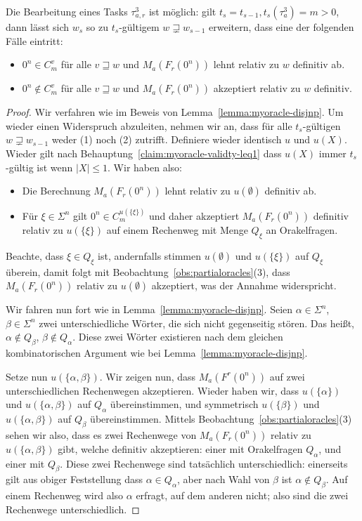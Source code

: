 \begin{lemma}\label{lemma:myoracle-up}
    Die Bearbeitung eines Tasks $\tau^3_{a,r}$ ist möglich: gilt $t_s=t_{s-1}, t_{s}(\tau^3_{a})=m>0$, dann lässt sich $w_{s}$ so zu $t_{s}$-gültigem $w\sqsupsetneq w_{s-1}$ erweitern, dass eine der folgenden Fälle eintritt:
        \begin{itemize}[nosep,endpenalty=10000]
            \item $0^n\in C_m^v$ für alle $v\sqsupseteq w$ und $M_a(F_r(0^n))$ lehnt relativ zu $w$ definitiv ab.
            \item $0^n\not\in C_m^v$ für alle $v\sqsupseteq w$ und $M_a(F_r(0^n))$ akzeptiert relativ zu $w$ definitiv.
        \end{itemize}
\end{lemma}
\begin{proof}
Wir verfahren wie im Beweis von Lemma~\ref{lemma:myoracle-disjnp}.
Um wieder einen Widerspruch abzuleiten, nehmen wir an, dass für alle $t_{s}$-gültigen $w\sqsupsetneq w_{s-1}$ weder (1) noch (2) zutrifft.
Definiere wieder identisch $u$ und $u(X)$.
Wieder gilt nach Behauptung~\ref{claim:myoracle-validty-leq1} dass $u(X)$ immer $t_{s}$-gültig ist wenn $|X|\leq 1$.
Wir haben also:
\begin{itemize}[nosep]
    \item Die Berechnung $M_a(F_r(0^n))$ lehnt relativ zu $u(\emptyset)$ definitiv ab.
    \item Für $\xi\in \Sigma^{n}$ gilt $0^n\in C_m^{u(\{\xi\})}$ und daher akzeptiert $M_a(F_r(0^n))$ definitiv relativ zu $u(\{\xi\})$ auf einem Rechenweg mit Menge $Q_\xi$ an Orakelfragen.
\end{itemize}

Beachte, dass $\xi\in Q_\xi$ ist, andernfalls stimmen $u(\emptyset)$ und $u(\{\xi\})$ auf $Q_\xi$ überein, damit folgt mit Beobachtung~\ref{obs:partialoracles}(3), dass $M_a(F_r(0^n))$ relativ zu $u(\emptyset)$ akzeptiert, was der Annahme widerspricht.

Wir fahren nun fort wie in Lemma~\ref{lemma:myoracle-disjnp}.
Seien $\alpha\in\Sigma^{n}$, $\beta\in\Sigma^{n}$ zwei unterschiedliche Wörter, die sich nicht gegenseitig stören. Das heißt, $\alpha\not\in Q_\beta$, $\beta\not\in Q_\alpha$.
Diese zwei Wörter existieren nach dem gleichen kombinatorischen Argument wie bei Lemma~\ref{lemma:myoracle-disjnp}.

Setze nun $u(\{\alpha, \beta\})$. Wir zeigen nun, dass $M_a(F^r(0^n))$ auf zwei unterschiedlichen Rechenwegen akzeptieren.
Wieder haben wir, dass $u(\{\alpha\})$ und $u(\{\alpha, \beta\})$ auf $Q_\alpha$ übereinstimmen, und symmetrisch $u(\{\beta\})$ und $u(\{\alpha, \beta\})$ auf $Q_\beta$ übereinstimmen.
Mittels Beobachtung~\ref{obs:partialoracles}(3) sehen wir also, dass es zwei Rechenwege von $M_a(F_r(0^n))$ relativ zu $u(\{\alpha, \beta\})$ gibt, welche definitiv akzeptieren: einer mit Orakelfragen $Q_\alpha$, und einer mit $Q_\beta$.
Diese zwei Rechenwege sind tatsächlich unterschiedlich:
einerseits gilt aus obiger Feststellung dass $\alpha\in Q_\alpha$, aber nach Wahl von $\beta$ ist $\alpha\not\in Q_\beta$. Auf einem Rechenweg wird also $\alpha$ erfragt, auf dem anderen nicht; also sind die zwei Rechenwege unterschiedlich.



\end{proof}
